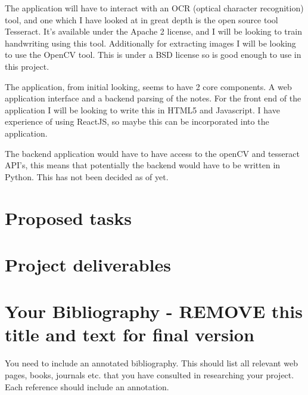 \documentclass[11pt,fleqn,twoside]{article}
\begin{document}
The application will have to interact with an OCR (optical character recognition) tool, and one which I have looked at in great depth is the open source tool Tesseract. It's available under the Apache 2 license, and I will be looking to train handwriting using this tool. Additionally for extracting images I will be looking to use the OpenCV tool. This is under a BSD license so is good enough to use in this project.

The application, from initial looking, seems to have 2 core components. A web application interface and a backend parsing of the notes. For the front end of the application I will be looking to write this in HTML5 and Javascript. I have experience of using ReactJS, so maybe this can be incorporated into the application.

The backend application would have to have access to the openCV and tesseract API's, this means that potentially the backend would have to be written in Python. This has not been decided as of yet.

\section{Proposed tasks}


\section{Project deliverables}

%
%
\section*{Your Bibliography - REMOVE this title and text for final version}
%
You need to include an annotated bibliography. This should list all relevant web pages, books, journals etc. that you have consulted in researching your project. Each reference should include an annotation.
\end{document}
